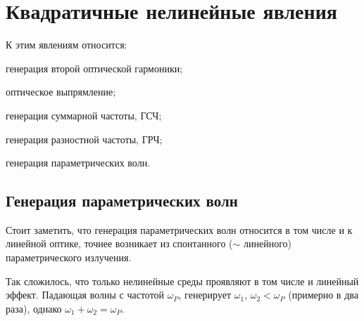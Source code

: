 







\section{Квадратичные нелинейные явления}

\noindent
К этим явлениям относится:  \vspace{-2mm}
\begin{itemize*}
    \item генерация второй оптической гармоники;
    \item оптическое выпрямление;
    \item генерация суммарной частоты, ГСЧ;
    \item генерация разностной частоты, ГРЧ;
    \item генерация параметрических волн.
\end{itemize*}



\subsection{Генерация параметрических волн}

Стоит заметить, что генерация параметрических волн относится в том числе и к линейной оптике, точнее возникает из спонтанного ($\sim$ линейного) параметрического излучения.

Так сложилось, что только нелинейные среды проявляют в том числе и линейный эффект. Падающая волны с частотой $\omega_P$, генерирует $\omega_1,\, \omega_2 < \omega_P$ (примерно в два раза), однако $\omega_1 + \omega_2 = \omega_P$. 


